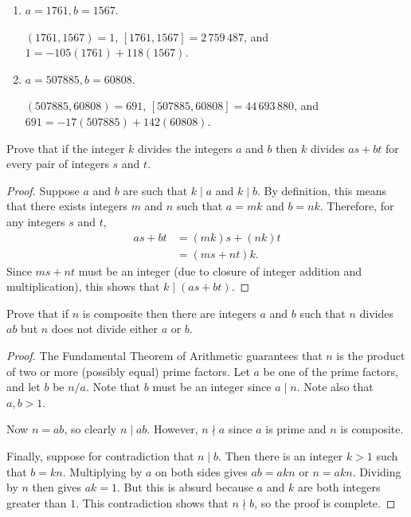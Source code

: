 \begin{enumerate}
\item
  $a = 1761, b = 1567$.
  \begin{solution}
    $(1761, 1567) = 1$, $[1761, 1567] = 2\,759\,487$, and
    $1 = -105(1761) + 118(1567)$.
  \end{solution}

\item
  $a = 507885, b = 60808$.
  \begin{solution}
    $(507885, 60808) = 691$, $[507885, 60808] = 44\,693\,880$, and
    $691 = -17(507885) + 142(60808)$.
  \end{solution}

\end{enumerate}

 Prove that if the integer $k$ divides the integers $a$
and $b$ then $k$ divides $as + bt$ for every pair of integers $s$ and
$t$.
\begin{proof}
  Suppose $a$ and $b$ are such that $k\mid a$ and $k\mid b$. By
  definition, this means that there exists integers $m$ and $n$ such
  that $a = mk$ and $b = nk$. Therefore, for any integers $s$ and $t$,
  \begin{align*}
    as + bt &= (mk)s + (nk)t \\
            &= (ms + nt)k.
  \end{align*}
  Since $ms + nt$ must be an integer (due to closure of integer
  addition and multiplication), this shows that $k\mid(as + bt)$.
\end{proof}

 Prove that if $n$ is composite then there are integers
$a$ and $b$ such that $n$ divides $ab$ but $n$ does not divide either
$a$ or $b$.
\begin{proof}
  The Fundamental Theorem of Arithmetic guarantees that $n$ is the
  product of two or more (possibly equal) prime factors. Let $a$ be
  one of the prime factors, and let $b$ be $n / a$. Note that $b$ must
  be an integer since $a\mid n$. Note also that $a,b > 1$.

  Now $n = ab$, so clearly $n \mid ab$. However, $n \nmid a$ since $a$
  is prime and $n$ is composite.

  Finally, suppose for contradiction that $n\mid b$. Then there is an
  integer $k > 1$ such that $b = kn$. Multiplying by $a$ on both sides
  gives $ab = akn$ or $n = akn$. Dividing by $n$ then gives $ak =
  1$. But this is absurd because $a$ and $k$ are both integers greater
  than $1$. This contradiction shows that $n\nmid b$, so the proof is
  complete.
\end{proof}


